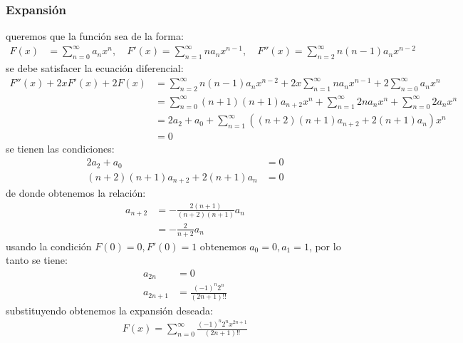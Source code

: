 \documentclass{article}
\begin{document}
\begin{tcolorbox}[breakable]
    \subsubsection*{Expansión}
    queremos que la función sea de la forma:
    \begin{align*}
        F(x) &= \sum_{n=0}^\infty a_n x^n, 
        \quad F'(x) = \sum_{n=1}^\infty na_n x^{n-1},
        \quad F''(x) = \sum_{n=2}^\infty n(n-1)a_n x^{n-2}
    \end{align*}
    se debe satisfacer la ecuación diferencial:
    \begin{align*}
        F''(x) + 2xF'(x) + 2F(x) 
        &= \sum_{n=2}^\infty n(n-1)a_n x^{n-2} + 2x\sum_{n=1}^\infty na_n x^{n-1} + 2\sum_{n=0}^\infty a_n x^n\\
        &= \sum_{n=0}^\infty (n+1)(n+1)a_{n+2}x^n + \sum_{n=1}^\infty 2na_nx^n + \sum_{n=0}^\infty 2a_nx^n \\
        &= 2a_{2} + a_0 + \sum_{n=1}^\infty ((n+2)(n+1)a_{n+2}+2(n+1)a_n) x^n \\
        &= 0
    \end{align*}
    se tienen las condiciones:
    \begin{align*}
        2a_2 + a_0 &= 0 \\
        (n+2)(n+1)a_{n+2}+2(n+1)a_n &= 0
    \end{align*}
    de donde obtenemos la relación:
    \begin{align*}
        a_{n+2} 
        &= -\frac{2(n+1)}{(n+2)(n+1)}a_n \\
        &= -\frac{2}{n+2}a_n
    \end{align*}
    usando la condición $F(0) = 0, F'(0) = 1$ obtenemos $a_0 = 0, a_1 = 1$, por lo tanto se tiene:
    \begin{align*}
        a_{2n} &= 0 \\
        a_{2n+1} &= \frac{(-1)^{n}2^{n}}{(2n+1)!!}
    \end{align*}
    substituyendo obtenemos la expansión deseada:
    \begin{align*}
        F(x) = \sum_{n=0}^\infty \frac{(-1)^n2^nx^{2n+1}}{(2n+1)!!}
    \end{align*}

\end{tcolorbox}
\end{document}

